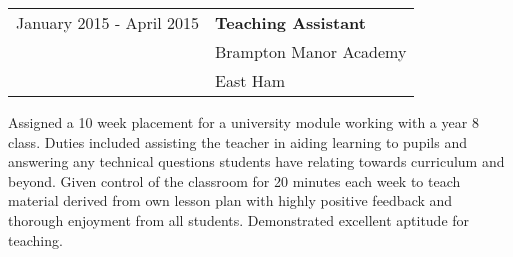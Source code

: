 \begin{flushleft}
\begin{tabular}{r|l}
\indent January 2015 - April 2015 & \textbf{Teaching Assistant} \\
\indent & {\large{Brampton Manor Academy}} \\
\indent & East Ham
\end{tabular}
\end{flushleft}

\noindent Assigned a 10 week placement for a university module working with a year 8 class. Duties included assisting the teacher in aiding learning to pupils and answering any technical questions students have relating towards curriculum and beyond. Given control of the classroom for 20 minutes each week to teach material derived from own lesson plan with highly positive feedback and thorough enjoyment from all students. Demonstrated excellent aptitude for teaching. \newline
